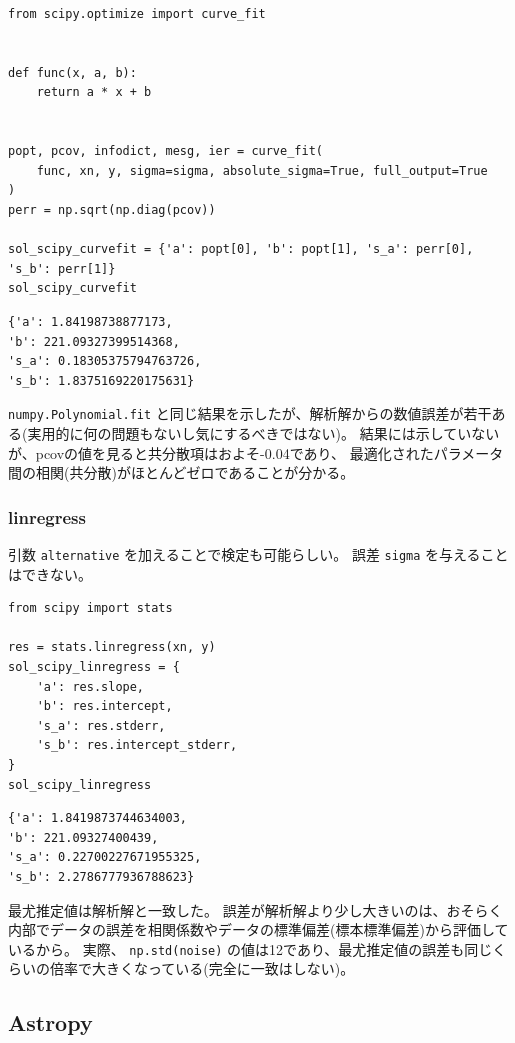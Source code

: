 \documentclass[a4paper, 8pt, notitlepage, uplatex, dvipdfmx]{jsarticle}
\begin{document}
\begin{verbatim}
from scipy.optimize import curve_fit


def func(x, a, b):
    return a * x + b


popt, pcov, infodict, mesg, ier = curve_fit(
    func, xn, y, sigma=sigma, absolute_sigma=True, full_output=True
)
perr = np.sqrt(np.diag(pcov))

sol_scipy_curvefit = {'a': popt[0], 'b': popt[1], 's_a': perr[0], 's_b': perr[1]}
sol_scipy_curvefit
\end{verbatim}

\label{}
\begin{verbatim}
{'a': 1.84198738877173,
'b': 221.09327399514368,
's_a': 0.18305375794763726,
's_b': 1.8375169220175631}
\end{verbatim}

\texttt{numpy.Polynomial.fit} と同じ結果を示したが、解析解からの数値誤差が若干ある(実用的に何の問題もないし気にするべきではない)。
結果には示していないが、pcovの値を見ると共分散項はおよそ-0.04であり、
最適化されたパラメータ間の相関(共分散)がほとんどゼロであることが分かる。
\subsubsection{linregress}
\label{sec:org492e565}
引数 \texttt{alternative} を加えることで検定も可能らしい。
誤差 \texttt{sigma} を与えることはできない。

\begin{verbatim}
from scipy import stats

res = stats.linregress(xn, y)
sol_scipy_linregress = {
    'a': res.slope,
    'b': res.intercept,
    's_a': res.stderr,
    's_b': res.intercept_stderr,
}
sol_scipy_linregress
\end{verbatim}

\label{}
\begin{verbatim}
{'a': 1.8419873744634003,
'b': 221.09327400439,
's_a': 0.22700227671955325,
's_b': 2.2786777936788623}
\end{verbatim}

最尤推定値は解析解と一致した。
誤差が解析解より少し大きいのは、おそらく内部でデータの誤差を相関係数やデータの標準偏差(標本標準偏差)から評価しているから。
実際、 \texttt{np.std(noise)} の値は12であり、最尤推定値の誤差も同じくらいの倍率で大きくなっている(完全に一致はしない)。
\subsection{Astropy}
\label{sec:orge3e2e14}
\end{document}
